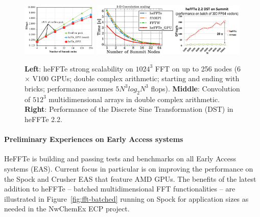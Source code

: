 \begin{figure}[htb]
   \centering
   \includegraphics[width=0.32\textwidth]{projects/2.3.3-MathLibs/2.3.3.13-CLOVER/heFFTeStrongScalability}
   \includegraphics[width=0.66\textwidth]{projects/2.3.3-MathLibs/2.3.3.13-CLOVER/heffte_conv_dst}
    \caption{\label{fig:fft-ecp-progress}
    {\bf Left}: heFFTe strong scalability on $1024^3$ 
                FFT on up to 256 nodes (6$\times$ V100 GPUs;
                double complex arithmetic; starting and ending with bricks; 
                performance assumes $5 N^3 log_2 N^3$ flops).
    {\bf Middle}: Convolution of $512^3$ multidimensional arrays in double complex arithmetic.
    {\bf Right}: Performance of the Discrete Sine Transformation (DST) in heFFTe 2.2.
    }
\end{figure}

\paragraph{Preliminary Experiences on Early Access systems} 
HeFFTe is building and passing tests and benchmarks on all Early Access systems (EAS). 
Current focus in particular is on improving the performance on the Spock and Crusher EAS that
feature AMD GPUs. The benefits of the latest addition to heFFTe -- batched multidimensional 
FFT functionalities -- are illustrated in Figure~\ref{fig:fft-batched} running on Spock for application 
sizes as needed in the NwChemEx ECP project.

